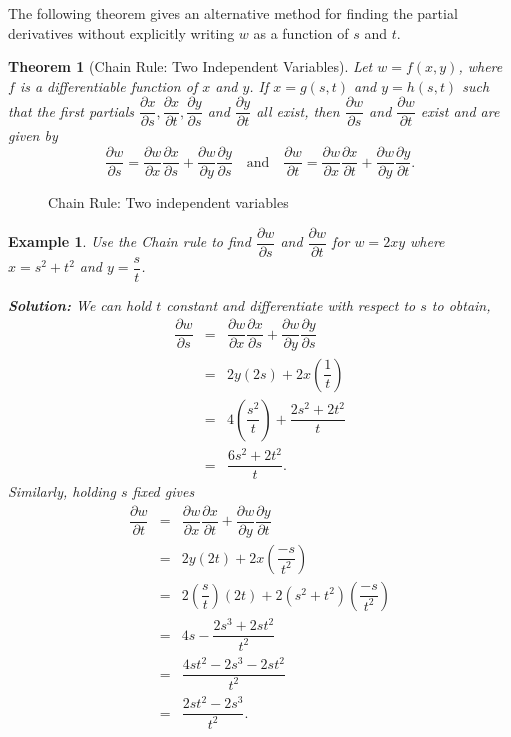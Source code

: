 \documentclass[titlepage,a4paper,12pt]{report}
\newtheorem{example}{Example}[section]
\newtheorem{theorem}{Theorem}[section]
\begin{document}
  \noindent The following theorem gives an alternative method for finding the partial derivatives without explicitly writing $w$ as a function of $s$ and $t$.
  \begin{theorem}[Chain Rule: Two Independent Variables] 
 Let $w=f(x,y)$, where $f$ is a differentiable function of $x$ and $y$. If $x=g(s,t)$ and $y=h(s,t)$ such that the first partials $\dfrac{\partial x}{\partial s}, \dfrac{\partial x}{\partial t}, \dfrac{\partial y}{\partial s}$ and $ \dfrac{\partial y}{\partial t}$ all exist, then $\dfrac{\partial w}{\partial s}$ and $\dfrac{\partial w}{\partial t}$ exist and are given by 
 \[\dfrac{\partial w}{\partial s}=\dfrac{\partial w}{\partial x} \dfrac{\partial x}{\partial s}+\dfrac{\partial w}{\partial y}\dfrac{\partial y}{\partial s} \quad \mbox{and} \quad \dfrac{\partial w}{\partial t}=\dfrac{\partial w}{\partial x} \dfrac{\partial x}{\partial t}+\dfrac{\partial w}{\partial y}\dfrac{\partial y}{\partial t}.\]
  \end{theorem}
  \begin{figure}[h!]
  
  \caption{Chain Rule: Two independent variables}
  \end{figure}
  \begin{example}
  Use the Chain rule to find $\dfrac{\partial w}{\partial s}$ and $\dfrac{\partial w}{\partial t}$ for $w=2xy$ where $x=s^2+t^2$ and $y=\dfrac{s}{t}$.
  
  \noindent \textbf{Solution:} We can hold $t$ constant and differentiate with respect to $s$ to obtain, 
\begin{eqnarray*}
\dfrac{\partial w}{\partial s} &=& \dfrac{\partial w}{\partial x} \dfrac{\partial x}{\partial s}+\dfrac{\partial w}{\partial y}\dfrac{\partial y}{\partial s}\\
&=& 2y(2s)+2x\left(\dfrac{1}{t}\right)\\
&=& 4\left(\dfrac{s^2}{t}\right)+\dfrac{2s^2+2t^2}{t}\\
&=& \dfrac{6s^2+2t^2}{t}.
\end{eqnarray*}
Similarly, holding $s$ fixed gives 
\begin{eqnarray*}
 \dfrac{\partial w}{\partial t} &=& \dfrac{\partial w}{\partial x} \dfrac{\partial x}{\partial t}+\dfrac{\partial w}{\partial y}\dfrac{\partial y}{\partial t} \\
 &=& 2y(2t)+2x\left(\dfrac{-s}{t^2}\right)\\
 &=& 2\left(\dfrac{s}{t}\right) (2t)+2(s^2+t^2)\left(\dfrac{-s}{t^2}\right)\\
 &=& 4s-\dfrac{2s^3+2st^2}{t^2}\\
 &=& \dfrac{4st^2-2s^3-2st^2}{t^2}\\
 &=& \dfrac{2st^2-2s^3}{t^2}.
\end{eqnarray*}
  \end{example}
\end{document}
